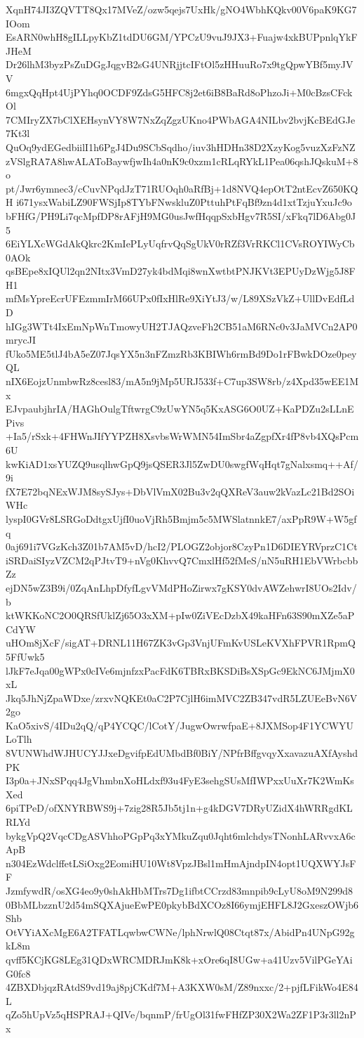 XqnH74JI3ZQVTT8Qx17MVeZ/ozw5qejs7UxHk/gNO4WbhKQkv00V6paK9KG7IOom
EsARN0whH8gILLpyKbZ1tdDU6GM/YPCzU9vuJ9JX3+Fuajw4xkBUPpnlqYkFJHeM
Dr26lhM3byzPsZuDGgJqgvB2sG4UNRjjtcIFtOl5zHHuuRo7x9tgQpwYBf5myJVV
6mgxQqHpt4UjPYhq0OCDF9ZdsG5HFC8j2et6iB8BaRd8oPhzoJi+M0cBzsCFckOl
7CMIryZX7bClXEHsynVY8W7NxZqZgzUKno4PWbAGA4NILbv2bvjKcBEdGJe7Kt3l
QuOq9ydEGedbiilI1h6PgJ4Du9SCbSqdho/iuv3hHDHn38D2XzyKog5vuzXzFzNZ
zVSlgRA7A8hwALAToBaywfjwIh4a0nK9c0xzm1cRLqRYkL1Pea06qshJQskuM+8o
pt/Jwr6ymnec3/cCuvNPqdJzT71RUOqh0aRfBj+1d8NVQ4epOtT2ntEcvZ650KQH
i671ysxWabiLZ90FWSjIp8TYbFNwskluZ0PttuhPtFqBf9zn4d1xtTzjuYxuJc9o
bFHfG/PH9Li7qcMpfDP8rAFjH9MG0usJwfHqqpSxbHgv7R5SI/xFkq7lD6Abg0J5
6EiYLXcWGdAkQkrc2KmIePLyUqfrvQqSgUkV0rRZf3VrRKCl1CVsROYIWyCb0AOk
qsBEpe8xIQUl2qn2NItx3VmD27yk4bdMqi8wnXwtbtPNJKVt3EPUyDzWjg5J8FH1
mfMsYpreEcrUFEzmmIrM66UPx0fIxHlRe9XiYtJ3/w/L89XSzVkZ+UllDvEdfLdD
hIGg3WTt4IxEmNpWnTmowyUH2TJAQzveFh2CB51aM6RNc0v3JaMVCn2AP0mrycJI
fUko5ME5tlJ4bA5eZ07JqsYX5n3nFZmzRb3KBIWh6rmBd9Do1rFBwkDOze0peyQL
nIX6EojzUnmbwRz8cesl83/mA5n9jMp5URJ533f+C7up3SW8rb/z4Xpd35wEE1Mx
EJvpaubjhrIA/HAGhOulgTftwrgC9zUwYN5q5KxASG6O0UZ+KaPDZu2sLLnEPivs
+Ia5/rSxk+4FHWnJIfYYPZH8XsvbsWrWMN54ImSbr4aZgpfXr4fP8vb4XQsPcm6U
kwKiAD1xsYUZQ9usqlhwGpQ9jsQSER3Jl5ZwDU0swgfWqHqt7gNalxsmq++Af/9i
fX7E72bqNExWJM8sySJys+DbVlVmX02Bu3v2qQXReV3auw2kVazLc21Bd2SOiWHc
lyspI0GVr8LSRGoDdtgxUjfI0uoVjRh5Bmjm5c5MWSlatnnkE7/axPpR9W+W5gfq
0aj691i7VGzKch3Z01b7AM5vD/hcI2/PLOGZ2objor8CzyPn1D6DIEYRVprzC1Ct
iSRDaiSIyzVZCM2qPJtvT9+nVg0KhvvQ7CmxlHf52fMeS/nN5uRH1EbVWrbcbbZz
ejDN5wZ3B9i/0ZqAnLhpDfyfLgvVMdPHoZirwx7gKSY0dvAWZehwrI8UOs2Idv/b
ktWKKoNC2O0QRSfUklZj65O3xXM+pIw0ZiVEcDzbX49kaHFn63S90mXZe5aPCdYW
uHOm8jXcF/sigAT+DRNL11H67ZK3vGp3VnjUFmKvUSLeKVXhFPVR1RpmQ5FfUwk5
lJkF7eJqa00gWPx0cIVe6mjnfzxPacFdK6TBRxBKSDiBsXSpGc9EkNC6JMjmX0xL
Jkq5JhNjZpaWDxe/zrxvNQKEt0aC2P7CjlH6imMVC2ZB347vdR5LZUEeBvN6V2go
KaO5xivS/4IDu2qQ/qP4YCQC/lCotY/JugwOwrwfpaE+8JXMSop4F1YCWYULoTlh
8VUNWhdWJHUCYJJxeDgvifpEdUMbdBf0BiY/NPfrBffgvqyXxavazuAXfAyshdPK
I3p0a+JNxSPqq4JgVhmbnXoHLdxf93u4FyE3sehgSUsMfIWPxxUuXr7K2WmKsXed
6piTPeD/ofXNYRBWS9j+7zig28R5Jb5tj1n+g4kDGV7DRyUZidX4hWRRgdKLRLYd
bykgVpQ2VqcCDgASVhhoPGpPq3xYMkuZqu0Jqht6mlchdysTNonhLARvvxA6cApB
n304EzWdclffetLSiOxg2EomiHU10Wt8VpzJBsl1mHmAjndpIN4opt1UQXWYJsFF
JzmfywdR/osXG4eo9y0shAkHbMTrs7Dg1ifbtCCrzd83mnpib9cLyU8oM9N299d8
0BbMLbzznU2d54mSQXAjueEwPE0pkybBdXCOz8I66ymjEHFL8J2GxeszOWjb6Shb
OtVYiAXcMgE6A2TFATLqwbwCWNe/lphNrwlQ08Ctqt87x/AbidPn4UNpG92gkL8m
qvff5KCjKG8LEg31QDxWRCMDRJmK8k+xOre6qI8UGw+a41Uzv5VilPGeYAiG0fc8
4ZBXDbjqzRAtdS9vd19aj8pjCKdf7M+A3KXW0sM/Z89nxxc/2+pjfLFikWo4E84L
qZo5hUpVz5qHSPRAJ+QIVe/bqnmP/frUgOl31fwFHfZP30X2Wa2ZF1P3r3ll2nPx
